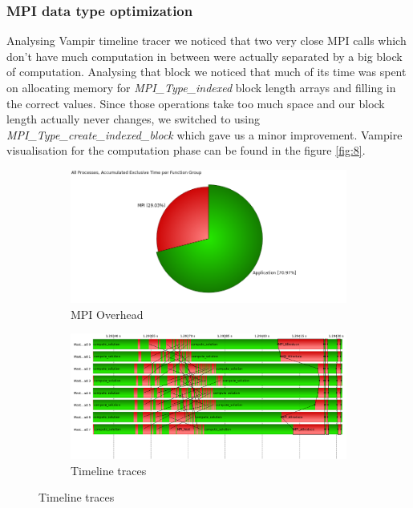 \documentclass{article}
\begin{document}
\subsubsection{MPI data type optimization}
Analysing Vampir timeline tracer we noticed that two very close MPI calls which don't have much computation in between were actually separated by a big block of computation. Analysing that block we noticed that much of its time was spent on allocating memory for \textit{MPI\_Type\_indexed} block length arrays and filling in the correct values. Since those operations take too much space and our block length actually never changes, we switched to using \textit{MPI\_Type\_create\_indexed\_block} which gave us a minor improvement. Vampire visualisation for the computation phase can be found in the figure \ref{fig:8}.
\begin{figure}
	\centering
	\begin{subfigure}[b]{\textwidth}
		\includegraphics[width=\textwidth]{iter-pent-dual-allread-8-Function_Summary_traces.png}
		\caption{MPI Overhead}
		\label{fig:overhead}
	\end{subfigure}
	\begin{subfigure}[b]{\textwidth}
		\includegraphics[width=\textwidth]{iter-pent-dual-allread-8-Master_Timeline_traces.png}
		\caption{Timeline traces}
		\label{fig:traces}

\end{subfigure}
\end{figure}
\end{document}
